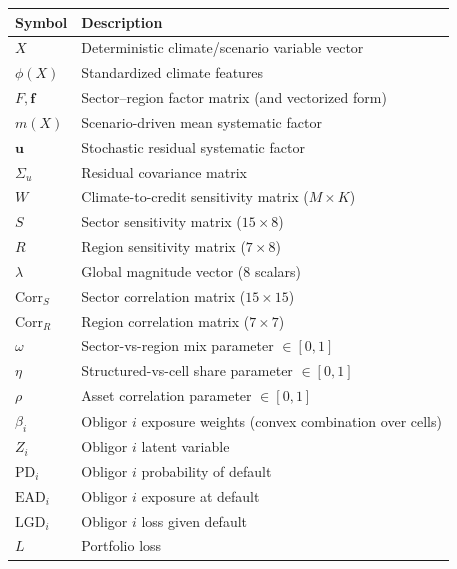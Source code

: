 \documentclass[11pt,a4paper]{article}
\begin{document}
\begin{table}[h]
\centering
\begin{tabular}{ll}
\toprule
\textbf{Symbol} & \textbf{Description} \\
\midrule
$X$ & Deterministic climate/scenario variable vector \\
$\phi(X)$ & Standardized climate features \\
$F, \mathbf{f}$ & Sector--region factor matrix (and vectorized form) \\
$m(X)$ & Scenario-driven mean systematic factor \\
$\mathbf{u}$ & Stochastic residual systematic factor \\
$\Sigma_u$ & Residual covariance matrix \\
$W$ & Climate-to-credit sensitivity matrix ($M \times K$) \\
$S$ & Sector sensitivity matrix ($15 \times 8$) \\
$R$ & Region sensitivity matrix ($7 \times 8$) \\
$\lambda$ & Global magnitude vector (8 scalars) \\
$\text{Corr}_S$ & Sector correlation matrix ($15 \times 15$) \\
$\text{Corr}_R$ & Region correlation matrix ($7 \times 7$) \\
$\omega$ & Sector-vs-region mix parameter $\in [0,1]$ \\
$\eta$ & Structured-vs-cell share parameter $\in [0,1]$ \\
$\rho$ & Asset correlation parameter $\in [0,1]$ \\
$\beta_i$ & Obligor $i$ exposure weights (convex combination over cells) \\
$Z_i$ & Obligor $i$ latent variable \\
$\text{PD}_i$ & Obligor $i$ probability of default \\
$\text{EAD}_i$ & Obligor $i$ exposure at default \\
$\text{LGD}_i$ & Obligor $i$ loss given default \\
$L$ & Portfolio loss \\
\bottomrule
\end{tabular}
\end{table}
\end{document}
